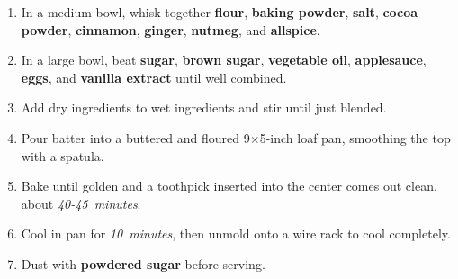 \documentclass[11pt,letterpaper]{article}
\begin{document}
\begin{enumerate}
    \item In a medium bowl, whisk together \textbf{flour}, \textbf{baking powder}, \textbf{salt}, \textbf{cocoa powder}, \textbf{cinnamon}, \textbf{ginger}, \textbf{nutmeg}, and \textbf{allspice}.
    
    \item In a large bowl, beat \textbf{sugar}, \textbf{brown sugar}, \textbf{vegetable oil}, \textbf{applesauce}, \textbf{eggs}, and \textbf{vanilla extract} until well combined.
    
    \item Add dry ingredients to wet ingredients and stir until just blended.
    
    \item Pour batter into a buttered and floured 9×5-inch loaf pan, smoothing the top with a spatula.
    
    \item Bake until golden and a toothpick inserted into the center comes out clean, about \textit{40-45~minutes}.
    
    \item Cool in pan for \textit{10~minutes}, then unmold onto a wire rack to cool completely.
    
    \item Dust with \textbf{powdered sugar} before serving.
\end{enumerate}
\end{document}
